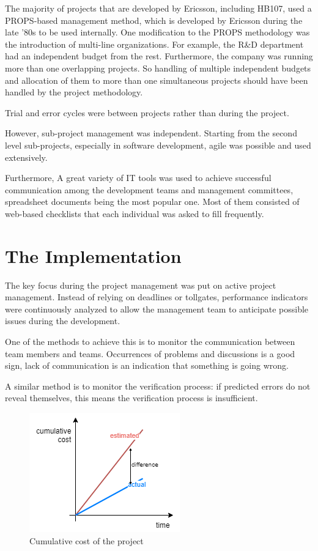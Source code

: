 \documentclass[conference]{IEEEtran}
\begin{document}
The majority of projects that are developed by Ericsson, including HB107, used a PROPS-based management method, which is developed by Ericsson during the late '80s to be used internally. One modification to the PROPS methodology was the introduction of multi-line organizations. For example, the R\&D department had an independent budget from the rest. Furthermore, the company was running more than one overlapping projects. So handling of multiple independent budgets and allocation of them to more than one simultaneous projects should have been handled by the project methodology. 

Trial and error cycles were between projects rather than during the project.

However, sub-project management was independent. Starting from the second level sub-projects, especially in software development, agile was possible and used extensively.



Furthermore, A great variety of IT tools was used to achieve successful communication among the development teams and management committees, spreadsheet documents being the most popular one. Most of them consisted of web-based checklists that each individual was asked to fill frequently.

\section{The Implementation}
The key focus during the project management was put on active project management. Instead of relying on deadlines or tollgates, performance indicators were continuously analyzed to allow the management team to anticipate possible issues during the development. 

One of the methods to achieve this is to monitor the communication between team members and teams. Occurrences of problems and discussions is a good sign, lack of communication is an indication that something is going wrong. 

A similar method is to monitor the verification process: if predicted errors do not reveal themselves, this means the verification process is insufficient. 

\begin{figure}[h]
    \centering
    \includegraphics[width=0.8\linewidth]{cost.png}
    \caption{Cumulative cost of the project}
    \label{fig:cost}
\end{figure}
\end{document}
